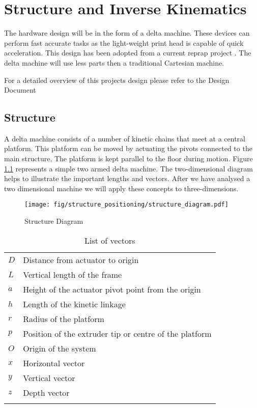 \documentclass[a4paper, 11pt, twoside]{Thesis}  %
\begin{document}
\chapter{Structure and Inverse Kinematics }
\label{Structure and Inverse Kinematics }

The hardware design will be in the form of a delta machine. These devices can perform fast accurate tasks as the light-weight print head is capable of quick acceleration. This design has been adopted from a current reprap project \cite{5}. The delta machine will use less parts then a traditional Cartesian machine.

For a detailed overview of this projects design please refer to the Design Document

\section{Structure}

A delta machine consists of a number of kinetic chains that meet at a central platform. This platform can be moved by actuating the pivots connected to the main structure. The platform is kept parallel to the floor during motion. Figure \ref{fig:structure_diagram.svg} represents a simple two armed delta machine. The two-dimensional diagram helps to illustrate the important lengths and vectors. After we have analysed a two dimensional machine we will apply these concepts to three-dimensions.

\begin{figure}[H]
\centering%
\texttt{[image: fig/structure\_positioning/structure\_diagram.pdf]}
\caption{Structure Diagram}
\label{fig:structure_diagram.svg}
\end{figure}
\begin{table}[!h]
\centering
\begin{tabulary}{\textwidth}{LL}
\hline\hline
 $D$  &  Distance from actuator to origin                       \\
 $L$  &  Vertical length of the frame                           \\
 $a$  &  Height of the actuator pivot point from the origin     \\
 $h$  &  Length of the kinetic linkage                          \\
 $r$  &  Radius of the platform                                 \\
 $p$  &  Position of the extruder tip or centre of the platform \\
 $O$  &  Origin of the system                                   \\
 $x$  &  Horizontal vector                                      \\
 $y$  &  Vertical vector                                        \\
 $z$  &  Depth vector                                           \\
\hline
\\
\end{tabulary}
\caption{	List of vectors}
\label{1}
\end{table}
\end{document}

